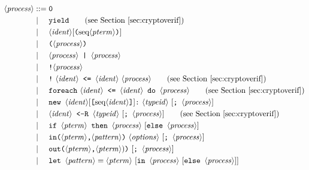\documentclass{book}
\newcommand{\nonterm}[1]{\langle\mathit{#1}\rangle}
\newcommand{\seq}[1]{\textrm{seq}\nonterm{#1}}
\begin{document}



\begin{figure}
\begin{align*}
\nonterm{process} &::=
	\texttt{0}\\
&\mid\phantom{:=}
        \texttt{yield}\tag{see Section~\ref{sec:cryptoverif}}\\
&\mid\phantom{:=}
   \nonterm{ident}[\texttt{(}\seq{pterm}\texttt{)}]\\
&\mid\phantom{:=}
	\texttt{(} \nonterm{process} \texttt{)}\\
&\mid\phantom{:=}
	\nonterm{process} \texttt{ \string| } \nonterm{process}\\
&\mid\phantom{:=}
	\texttt{!}\nonterm{process}\\
&\mid\phantom{:=}
	\texttt{!}\ \nonterm{ident}\texttt{ <= }\nonterm{ident}\ \nonterm{process}\tag{see Section~\ref{sec:cryptoverif}}\\
%
%
&\mid\phantom{:=}
	\texttt{foreach}\ \nonterm{ident}\texttt{ <= }\nonterm{ident}\texttt{ do }\nonterm{process}\tag{see Section~\ref{sec:cryptoverif}}\\
&\mid\phantom{:=}
	\texttt{new }\nonterm{ident}[\texttt{[}\seq{ident}\texttt{]}]\texttt{:}\ \nonterm{typeid}\ [\texttt{; }\nonterm{process}]\\
&\mid\phantom{:=}
 	\nonterm{ident}\texttt{ <-R }\nonterm{typeid}\ [\texttt{; } \nonterm{process}]\tag{see Section~\ref{sec:cryptoverif}}\\
&\mid\phantom{:=}
	\texttt{if } \nonterm{pterm} \texttt{ then } \nonterm{process}\textrm{ }[\texttt{else }\nonterm{process}]\\
&\mid\phantom{:=}
	\texttt{in}\texttt{(}\nonterm{pterm}\texttt{,}\nonterm{pattern}\texttt{)}\ \nonterm{options}\textrm{ }[\texttt{; }\nonterm{process}]\\
&\mid\phantom{:=}
	\texttt{out}\texttt{(}\nonterm{pterm}\texttt{,}\nonterm{pterm})\texttt{)}\textrm{ }[\texttt{; }\nonterm{process}]\\
&\mid\phantom{:=}
	\texttt{let }\nonterm{pattern} = \nonterm{pterm}\ [\texttt{in } \nonterm{process}\textrm{ }[\texttt{else }\nonterm{process}]]\\

\end{align*}
\end{figure}
\end{document}
